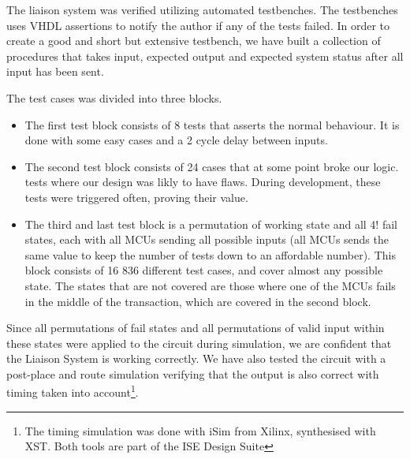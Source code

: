 The liaison system was verified utilizing automated testbenches. The testbenches uses VHDL assertions to notify the author if any
of the tests failed. In order to create a good and short but extensive testbench, we have built a collection of procedures that takes input, expected output
and expected system status after all input has been sent.

The test cases was divided into three blocks.
\begin{itemize}
\item The first test block consists of 8 tests that asserts the normal behaviour. It is done with some easy cases and a 2 cycle delay between inputs.

\item The second test block consists of 24 cases that at some point broke our logic.  tests where our design was likly to have flaws. During development, these tests were
triggered often, proving their value.

\item The third and last test block is a permutation of working state and all 4! fail states, each with all MCUs sending
all possible inputs (all MCUs sends the same value to keep the number of tests down to an affordable number). This block consists of 16 836 different test cases,
and cover almost any possible state. The states that are not covered are those where one of the MCUs fails in the middle of the transaction, which are covered in
the second block.
\end{itemize}

Since all permutations of fail states and all permutations of valid input within these states
were applied to the circuit during simulation, we are confident that the Liaison System is working correctly. We have also tested the circuit with a post-place and route
simulation verifying that the output is also correct with timing taken into account\footnote{The timing simulation was done with iSim from Xilinx, synthesised with XST. Both tools are part of the ISE Design Suite}.
